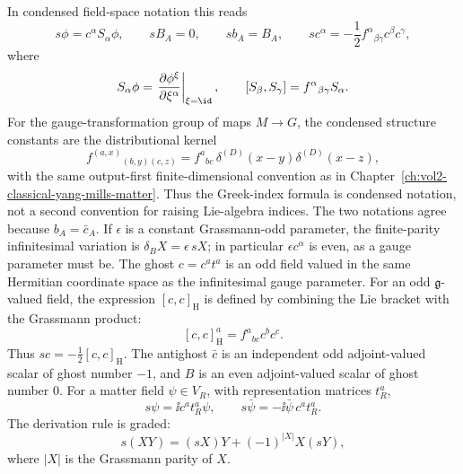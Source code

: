 In condensed field-space notation this reads
\begin{equation}
  s\phi=c^\alpha S_\alpha\phi,\qquad
  sB_A=0,\qquad
  sb_A=B_A,\qquad
  sc^\alpha=-\frac12f^\alpha{}_{\beta\gamma}c^\beta c^\gamma,
  \label{eq:brst-condensed-transformations}
\end{equation}
where
\[
  S_\alpha\phi
  =
  \left.
  \frac{\partial\phi^\xi}{\partial\xi^\alpha}
  \right|_{\xi=\id},
  \qquad
  [S_\beta,S_\gamma]=f^\alpha{}_{\beta\gamma}S_\alpha .
\]
For the gauge-transformation group of maps \(M\to G\), the condensed structure
constants are the distributional kernel
\[
  f^{(a,x)}{}_{(b,y)(c,z)}
  =
  f^a{}_{bc}\,\delta^{(D)}(x-y)\delta^{(D)}(x-z),
\]
with the same output-first finite-dimensional convention as in
Chapter~\ref{ch:vol2-classical-yang-mills-matter}.  Thus the Greek-index
formula is condensed notation, not a second convention for raising Lie-algebra
indices.  The two notations agree because \(b_A=\bar c_A\).  If \(\epsilon\) is a
constant Grassmann-odd parameter, the finite-parity infinitesimal variation is
\(\delta_B X=\epsilon\,sX\); in particular \(\epsilon c^\alpha\) is even, as a
gauge parameter must be.
The ghost \(c=c^a t^a\) is an odd field valued in the same Hermitian coordinate
space as the infinitesimal gauge parameter.  For an odd \(\mathfrak g\)-valued
field, the expression \([c,c]_{\mathrm H}\) is defined by combining the Lie
bracket with the Grassmann product:
\[
  [c,c]_{\mathrm H}^a=f^a{}_{bc}c^b c^c .
\]
Thus \(sc=-\frac12[c,c]_{\mathrm H}\).  The antighost \(\bar c\) is an
independent odd adjoint-valued scalar of ghost number \(-1\), and \(B\) is an
even adjoint-valued scalar of ghost number \(0\).
For a matter field \(\psi\in V_R\), with representation matrices \(t_R^a\),
\begin{equation}
  s\psi=\ii c^a t_R^a\psi,
  \qquad
  s\bar\psi=-\ii\bar\psi\,c^a t_R^a .
  \label{eq:brst-matter-transformations}
\end{equation}
The derivation rule is graded:
\[
  s(XY)=(sX)Y+(-1)^{|X|}X(sY),
\]
where \(|X|\) is the Grassmann parity of \(X\).


